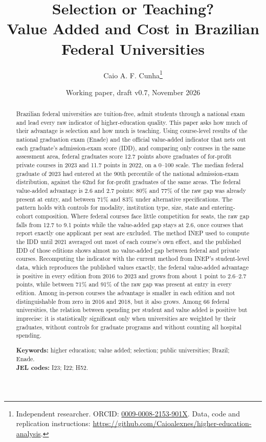 \documentclass[11pt,a4paper]{article}
\title{\textbf{Selection or Teaching?}\\[0.2em]\large Value Added and Cost in Brazilian Federal Universities}
\author{Caio A. F. Cunha\thanks{Independent researcher. ORCID: \href{https://orcid.org/0009-0008-2153-901X}{0009-0008-2153-901X}. Data, code and replication instructions: \url{https://github.com/Caioalexnes/higher-education-analysis}.}}
\date{Working paper, draft v0.7, November 2026}
\begin{document}
\maketitle

\begin{abstract}
\noindent Brazilian federal universities are tuition-free, admit students through a national exam and lead every raw indicator of higher-education quality. This paper asks how much of their advantage is selection and how much is teaching. Using course-level results of the national graduation exam (Enade) and the official value-added indicator that nets out each graduate's admission-exam score (IDD), and comparing only courses in the same assessment area, federal graduates score 12.7 points above graduates of for-profit private courses in 2023 and 11.7 points in 2022, on a 0--100 scale. The median federal graduate of 2023 had entered at the 90th percentile of the national admission-exam distribution, against the 62nd for for-profit graduates of the same areas. The federal value-added advantage is 2.6 and 2.7 points: 80\% and 77\% of the raw gap was already present at entry, and between 71\% and 83\% under alternative specifications. The pattern holds with controls for modality, institution type, size, state and entering-cohort composition. Where federal courses face little competition for seats, the raw gap falls from 12.7 to 9.1 points while the value-added gap stays at 2.6, once courses that report exactly one applicant per seat are excluded. The method INEP used to compute the IDD until 2021 averaged out most of each course's own effect, and the published IDD of those editions shows almost no value-added gap between federal and private courses. Recomputing the indicator with the current method from INEP's student-level data, which reproduces the published values exactly, the federal value-added advantage is positive in every edition from 2016 to 2023 and grows from about 1 point to 2.6--2.7 points, while between 71\% and 91\% of the raw gap was present at entry in every edition. Among in-person courses the advantage is smaller in each edition and not distinguishable from zero in 2016 and 2018, but it also grows. Among 66 federal universities, the relation between spending per student and value added is positive but imprecise: it is statistically significant only when universities are weighted by their graduates, without controls for graduate programs and without counting all hospital spending.

\medskip
\noindent\textbf{Keywords:} higher education; value added; selection; public universities; Brazil; Enade.\\
\noindent\textbf{JEL codes:} I23; I22; H52.
\end{abstract}
\end{document}

